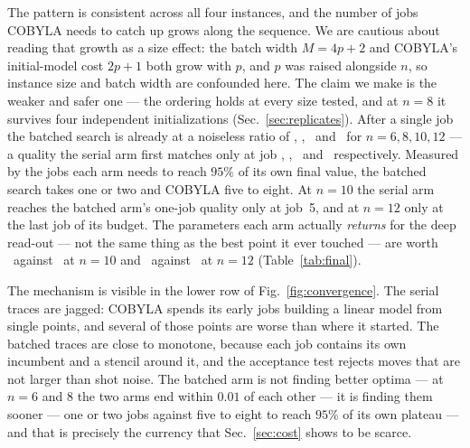 \documentclass[aps,prx,preprint,superscriptaddress,nofootinbib,longbibliography]{revtex4-2}
\begin{document}
\begin{table}[t]
\caption{Job efficiency on hardware. ``COBYLA needs'' is the number of jobs after which the
serial arm first reaches the quality the batched arm had after its \emph{first} job. ``Jobs to
95\%'' is the number of jobs each arm needs to reach $95\%$ of its own final noiseless ratio.}
\label{tab:convergence}
\begin{ruledtabular}

\end{ruledtabular}
\end{table}

The pattern is consistent across all four instances, and the number of jobs COBYLA needs
to catch up grows along the sequence. We are cautious about reading that growth as a
size effect: the batch width $M = 4p+2$ and COBYLA's initial-model cost $2p+1$ both grow with
$p$, and $p$ was raised alongside $n$, so instance size and batch width are confounded here. The
claim we make is the weaker and safer one --- the ordering holds at every size tested, and at
$n=8$ it survives four independent initializations (Sec.~\ref{sec:replicates}). After a single
job the batched search is already at a noiseless ratio of \bpsjobonesix, \bpsjoboneeight,
\bpsjoboneten\ and \bpsjobonetwelve\ for $n=6,8,10,12$ --- a quality the serial arm first
matches only at job \jmatchsix, \jmatcheight, \jmatchten\ and \jmatchtwelve\ respectively.
Measured by the jobs each arm needs to reach $95\%$ of its own final value, the batched search
takes one or two and COBYLA five to eight. At $n=10$ the serial arm reaches the batched arm's one-job quality only at job~5, and at
$n=12$ only at the last job of its budget. The parameters each arm actually \emph{returns} for
the deep read-out --- not the same thing as the best point it ever touched --- are worth
\ratioidealbpsten\ against \ratioidealserten\ at $n=10$ and \ratioidealbpstwelve\ against
\ratioidealsertwelve\ at $n=12$ (Table~\ref{tab:final}).

The mechanism is visible in the lower row of Fig.~\ref{fig:convergence}. The serial traces
are jagged: COBYLA spends its early jobs building a linear model from single points, and
several of those points are worse than where it started. The batched traces are close to
monotone, because each job contains its own incumbent and a stencil around it, and the
acceptance test rejects moves that are not larger than shot noise. The batched arm is not
finding better optima --- at $n=6$ and $8$ the two arms end within $0.01$ of each other --- it
is finding them sooner --- one or two jobs against five to eight to reach $95\%$ of its own
plateau --- and that is precisely the currency that Sec.~\ref{sec:cost} shows to
be scarce.
\end{document}

